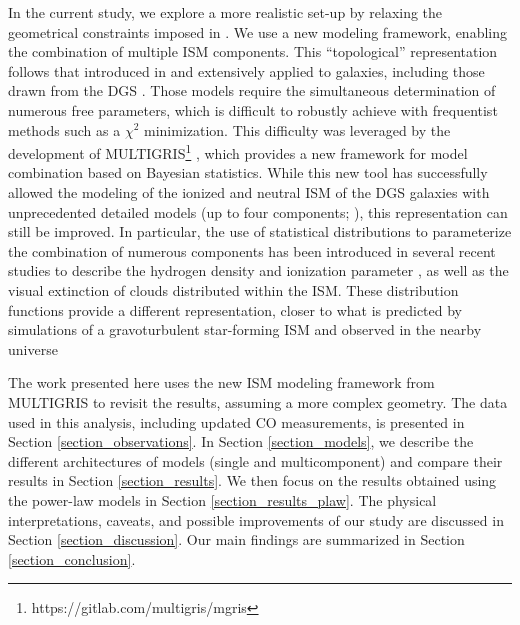 \documentclass{aa}
\newcommand{\toadd}[1]{{\color{red}{{[TO ADD: \bf #1]}}}}
\begin{document}
In the current study, we explore a more realistic set-up by relaxing the geometrical constraints imposed in . We use a new modeling framework, enabling the combination of multiple ISM components. This “topological” representation follows that introduced in \cite{pequignot_heating_nodate} and extensively applied to galaxies, including those drawn from the DGS \citep{2012_Cormier, polles_modeling_2019, cormier_herschel_2019, lebouteiller_neutral_2017}. Those models require the simultaneous determination of numerous free parameters, which is difficult to robustly achieve with frequentist methods such as a $\chi^2$ minimization. This difficulty was leveraged by the development of MULTIGRIS\footnote{https://gitlab.com/multigris/mgris} \citep{MULTIGRIS2022}, which provides a new framework for model combination based on Bayesian statistics. 
While this new tool has successfully allowed the modeling of the ionized and neutral ISM of the DGS galaxies with unprecedented detailed models (up to four components; \citealt{LebouteillerRamambason2022, Ramambason2022}), this representation can still be improved. In particular, the use of statistical distributions to parameterize the combination of numerous components has been introduced in several recent studies to describe the hydrogen density and ionization parameter \citep{richardson_interpreting_2014,richardson_interpreting_2016, richardson_addressing_2019}, as well as the visual extinction \citep{Bisbas_2021} of clouds distributed within the ISM. These distribution functions provide a different representation, closer to what is predicted by simulations of a gravoturbulent star-forming ISM \citep[e.g.,][]{Offner_2014, Burkhart_2018, Burkhart_2019, Appel_2023} and observed in the nearby universe \citep[e.g.,][]{Brunt_2015, Lombardi_2015}

The work presented here uses the new ISM modeling framework from MULTIGRIS to revisit the  results, assuming a more complex geometry. The data used in this analysis, including updated CO measurements, is presented in Section \ref{section_observations}. In Section \ref{section_models}, we describe the different architectures of models (single and multicomponent) and compare their results in Section \ref{section_results}. We then focus on the results obtained using the power-law models in Section \ref{section_results_plaw}. The physical interpretations, caveats, and possible improvements of our study are discussed in Section \ref{section_discussion}. Our main findings are summarized in Section \ref{section_conclusion}.
\end{document}
